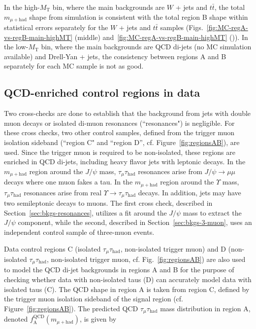 In the high-$M_{\text{T}}$ bin, where the main backgrounds are $W$ + jets and $t\bar{t}$, the total $m_{\mu+\text{had}}$ shape from simulation is consistent with the total region B shape within statistical errors separately for the $W$ + jets and $t\bar{t}$ samples (Figs.~\ref{fig:MC-regA-vs-regB-main-highMT} (middle) and~\ref{fig:MC-regA-vs-regB-main-highMT} (\cmsRight)).  In the low-$M_{\text{T}}$ bin, where the main backgrounds are QCD di-jets (no MC simulation available) and Drell-Yan + jets, the consistency between regions A and B separately for each MC sample is not as good.

\subsection{QCD-enriched control regions in data\label{sec:bkgs-qcd-control}}

Two cross-checks are done to establish that the background from jets with double muon decays or isolated di-muon resonances (``resonances") is negligible.  For these cross checks, two other control samples, defined from the trigger muon isolation sideband (``region C" and ``region D'', cf. Figure~\ref{fig:regionsAB}), are used.  Since the trigger muon is required to be non-isolated, these regions are enriched in QCD di-jets, including heavy flavor jets with leptonic decays.  In the $m_{\mu+\text{had}}$ region around the $J\slash\psi$ mass, $\tau_{\mu}\tau_{\text{had}}$ resonances arise from $J\slash\psi\rightarrow\mu\mu$ decays where one muon fakes a tau.  In the $m_{\mu+\text{had}}$ region around the $\Upsilon$ mass, $\tau_{\mu}\tau_{\text{had}}$ resonances arise from real $\Upsilon\rightarrow\tau_{\mu}\tau_{\text{had}}$ decays.  In addition, jets may have two semileptonic decays to muons.  The first cross check, described in Section~\ref{sec:bkgs-resonances}, utilizes a fit around the $J\slash\psi$ mass to extract the $J\slash\psi$ component, while the second, described in Section~\ref{sec:bkgs-3-muon}, uses an independent control sample of three-muon events.

Data control regions C (isolated $\tau_{\mu}\tau_{\text{had}}$, non-isolated trigger muon) and D (non-isolated $\tau_{\mu}\tau_{\text{had}}$, non-isolated trigger muon, cf. Fig.~\ref{fig:regionsAB}) are also used to model the QCD di-jet backgrounds in regions A and B for the purpose of checking whether data with non-isolated taus (D) can accurately model data with isolated taus (C). The QCD shape in region A is taken from region C, defined by the trigger muon isolation sideband of the signal region (cf. Figure~\ref{fig:regionsAB}).  The predicted QCD $\tau_{\mu}\tau_{\text{had}}$ mass distribution in region A, denoted $f_{\text{A}}^{\text{QCD}}(m_{\mu+\text{had}})$, is given by

